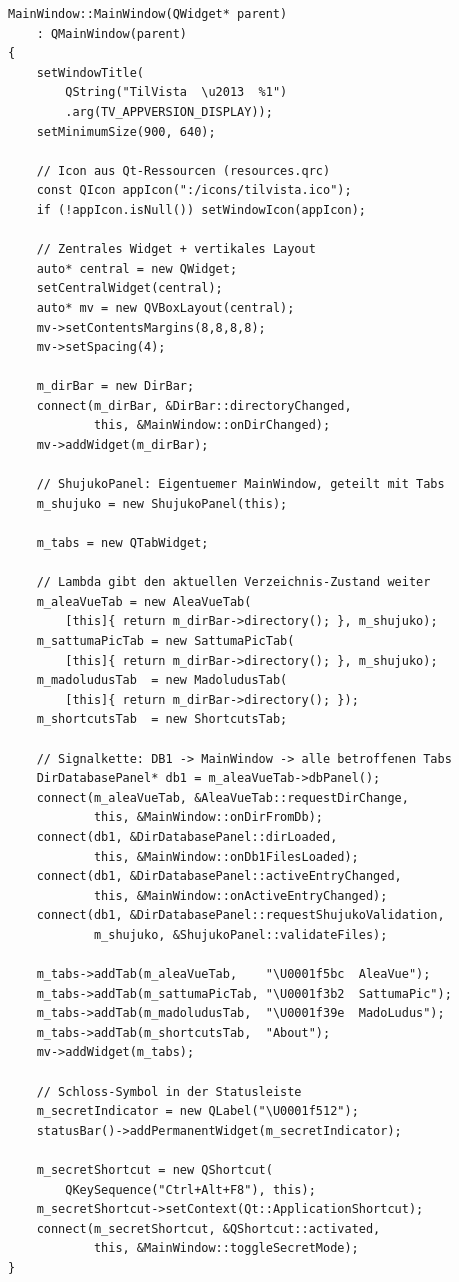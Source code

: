 \begin{lstlisting}[caption={Konstruktor: Fenster aufbauen}]
MainWindow::MainWindow(QWidget* parent)
    : QMainWindow(parent)
{
    setWindowTitle(
        QString("TilVista  \u2013  %1")
        .arg(TV_APPVERSION_DISPLAY));
    setMinimumSize(900, 640);

    // Icon aus Qt-Ressourcen (resources.qrc)
    const QIcon appIcon(":/icons/tilvista.ico");
    if (!appIcon.isNull()) setWindowIcon(appIcon);

    // Zentrales Widget + vertikales Layout
    auto* central = new QWidget;
    setCentralWidget(central);
    auto* mv = new QVBoxLayout(central);
    mv->setContentsMargins(8,8,8,8);
    mv->setSpacing(4);

    m_dirBar = new DirBar;
    connect(m_dirBar, &DirBar::directoryChanged,
            this, &MainWindow::onDirChanged);
    mv->addWidget(m_dirBar);

    // ShujukoPanel: Eigentuemer MainWindow, geteilt mit Tabs
    m_shujuko = new ShujukoPanel(this);

    m_tabs = new QTabWidget;

    // Lambda gibt den aktuellen Verzeichnis-Zustand weiter
    m_aleaVueTab = new AleaVueTab(
        [this]{ return m_dirBar->directory(); }, m_shujuko);
    m_sattumaPicTab = new SattumaPicTab(
        [this]{ return m_dirBar->directory(); }, m_shujuko);
    m_madoludusTab  = new MadoludusTab(
        [this]{ return m_dirBar->directory(); });
    m_shortcutsTab  = new ShortcutsTab;

    // Signalkette: DB1 -> MainWindow -> alle betroffenen Tabs
    DirDatabasePanel* db1 = m_aleaVueTab->dbPanel();
    connect(m_aleaVueTab, &AleaVueTab::requestDirChange,
            this, &MainWindow::onDirFromDb);
    connect(db1, &DirDatabasePanel::dirLoaded,
            this, &MainWindow::onDb1FilesLoaded);
    connect(db1, &DirDatabasePanel::activeEntryChanged,
            this, &MainWindow::onActiveEntryChanged);
    connect(db1, &DirDatabasePanel::requestShujukoValidation,
            m_shujuko, &ShujukoPanel::validateFiles);

    m_tabs->addTab(m_aleaVueTab,    "\U0001f5bc  AleaVue");
    m_tabs->addTab(m_sattumaPicTab, "\U0001f3b2  SattumaPic");
    m_tabs->addTab(m_madoludusTab,  "\U0001f39e  MadoLudus");
    m_tabs->addTab(m_shortcutsTab,  "About");
    mv->addWidget(m_tabs);

    // Schloss-Symbol in der Statusleiste
    m_secretIndicator = new QLabel("\U0001f512");
    statusBar()->addPermanentWidget(m_secretIndicator);

    m_secretShortcut = new QShortcut(
        QKeySequence("Ctrl+Alt+F8"), this);
    m_secretShortcut->setContext(Qt::ApplicationShortcut);
    connect(m_secretShortcut, &QShortcut::activated,
            this, &MainWindow::toggleSecretMode);
}
\end{lstlisting}


